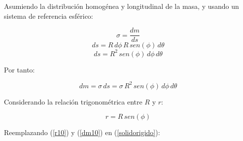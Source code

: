 \documentclass[letter,oneside,11pt]{article}
\begin{document}
Asumiendo la distribución homogénea y longitudinal de la masa, y usando un
sistema de referencia esférico:

\begin{equation*}
    \sigma = \frac{dm}{ds}
\end{equation*}
\begin{equation*}
    ds = R\, d\phi\, R\, sen(\phi)\, d\theta
\end{equation*}
\begin{equation*}
    ds = R^2\, sen (\phi)\, d\phi\, d\theta
\end{equation*}

Por tanto:

\begin{equation}
    dm = \sigma\, ds = \sigma\, R^2\, sen (\phi)\, d\phi\, d\theta
\label{dm10}
\end{equation}

Considerando la relación trigonométrica entre $R$ y $r$:

\begin{equation}
    r = R\, sen (\phi)
\label{r10}
\end{equation}

Reemplazando (\ref{r10}) y (\ref{dm10}) en (\ref{solidorigido}): 
\end{document}
